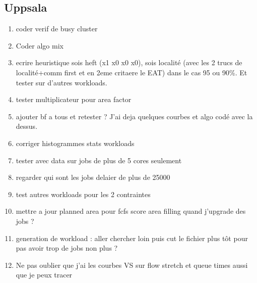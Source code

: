 \documentclass[a4paper]{article}
\begin{document}
	\subsection{Uppsala}
		\begin{enumerate}
			\item coder verif de busy cluster
			\item Coder algo mix
			\item ecrire heuristique sois heft (x1 x0 x0 x0), sois localité (avec les 2 trucs de localité+comm first et en 2eme critaere le EAT) dans le cas 95 ou 90\%. Et tester sur d'autres workloads.
			\item tester multiplicateur pour area factor
			\item ajouter bf a tous et retester ? J'ai deja quelques courbes et algo codé avec la dessus.
			\item corriger histogrammes stats workloads
			\item tester avec data sur jobs de plus de 5 cores seulement
			\item regarder qui sont les jobs delaier de plus de 25000
			\item test autres workloads pour les 2 contraintes
			\item mettre a jour planned area pour fcfs score area filling quand j'upgrade des jobs ?
			\item generation de workload : aller chercher loin puis cut le fichier plus tôt pour pas avoir trop de jobs non plus ?
			\item Ne pas oublier que j'ai les courbes VS sur flow stretch et queue times aussi que je peux tracer						
		\end{enumerate}
\end{document}
